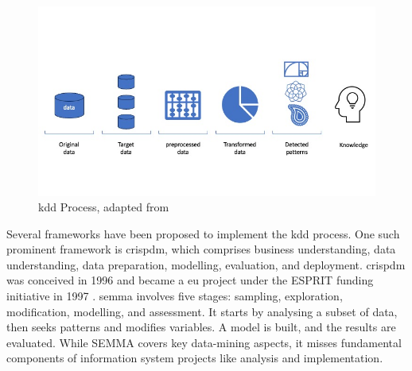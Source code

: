 \begin{figure}
\centering
\includegraphics[scale=0.55]{figures/imagens-tese.jpg}

\caption{\acl{kdd} Process, adapted from \cite{Fayyad_Piatetsky-Shapiro_Smyth_1996}} \label{fig:kdd-generic}
\end{figure}

Several frameworks have been proposed to implement the \ac{kdd} process. One such prominent framework is \ac{crispdm}, which comprises business understanding, data understanding, data preparation, modelling, evaluation, and deployment. \ac{crispdm} was conceived in 1996 and became a \ac{eu} project under the ESPRIT funding initiative in 1997 \cite{Chapman2000CRISPDM1S}. \ac{semma} \cite{rohanizadehProposedDataMining2009} involves five stages: sampling, exploration, modification, modelling, and assessment. It starts by analysing a subset of data, then seeks patterns and modifies variables. A model is built, and the results are evaluated. While SEMMA covers key data-mining aspects, it misses fundamental components of information system projects like analysis and implementation.

